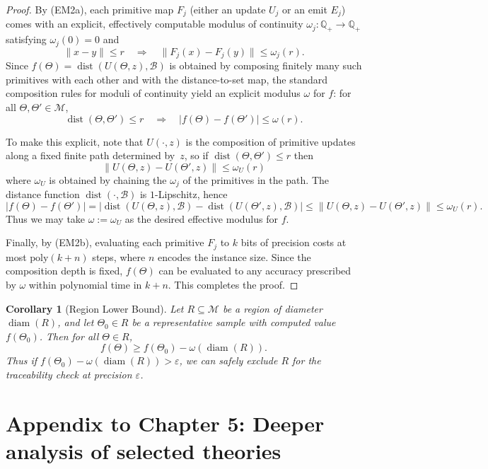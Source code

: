 \documentclass[12pt]{article}
\theoremstyle{definition}
\theoremstyle{plain}
\newtheorem{corollary}{Corollary}[section]
\begin{document}
\begin{proof}
By (EM2a), each primitive map $F_j$ (either an update $U_j$ or an emit $E_j$) comes with an explicit, effectively computable modulus of continuity $\omega_j:\mathbb{Q}_+\to\mathbb{Q}_+$ satisfying $\omega_j(0)=0$ and
\[
\|x-y\| \le r \quad\Rightarrow\quad \|F_j(x)-F_j(y)\| \le \omega_j(r).
\]
Since $f(\Theta)=\operatorname{dist}(U(\Theta,z),\mathcal{B})$ is obtained by composing finitely many such primitives with each other and with the distance-to-set map, the standard composition rules for moduli of continuity yield an explicit modulus $\omega$ for $f$:
for all $\Theta,\Theta'\in\mathcal{M}$,
\[
\operatorname{dist}(\Theta,\Theta') \le r \quad\Rightarrow\quad |f(\Theta)-f(\Theta')| \le \omega(r).
\]

To make this explicit, note that $U(\cdot,z)$ is the composition of primitive updates along a fixed finite path determined by~$z$, so if $\operatorname{dist}(\Theta,\Theta')\le r$ then
\[
\|U(\Theta,z)-U(\Theta',z)\| \le \omega_U(r)
\]
where $\omega_U$ is obtained by chaining the $\omega_j$ of the primitives in the path.  
The distance function $\operatorname{dist}(\cdot,\mathcal{B})$ is $1$-Lipschitz, hence
\[
|f(\Theta)-f(\Theta')| = \big|\operatorname{dist}(U(\Theta,z),\mathcal{B}) - \operatorname{dist}(U(\Theta',z),\mathcal{B})\big| 
\le \|U(\Theta,z)-U(\Theta',z)\| \le \omega_U(r).
\]
Thus we may take $\omega := \omega_U$ as the desired effective modulus for $f$.

Finally, by (EM2b), evaluating each primitive $F_j$ to $k$ bits of precision costs at most $\mathrm{poly}(k+n)$ steps, where $n$ encodes the instance size. Since the composition depth is fixed, $f(\Theta)$ can be evaluated to any accuracy prescribed by $\omega$ within polynomial time in $k+n$. This completes the proof.
\end{proof}


\begin{corollary}[Region Lower Bound]
\label{cor:region-lower}
Let \(R\subseteq\mathcal M\) be a region of diameter \(\operatorname{diam}(R)\), and let \(\Theta_0\in R\) be a representative sample with computed value \(f(\Theta_0)\). Then for all \(\Theta\in R\),
\[
f(\Theta) \ge f(\Theta_0) - \omega\!\left(\operatorname{diam}(R)\right).
\]
Thus if \(f(\Theta_0) - \omega(\operatorname{diam}(R)) > \varepsilon\), we can safely exclude \(R\) for the traceability check at precision \(\varepsilon\).
\end{corollary}

\section{Appendix to Chapter 5: Deeper analysis of selected theories}
\end{document}
